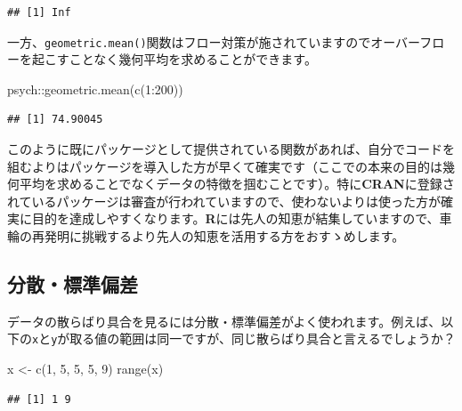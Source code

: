 \documentclass[
  12pt,
]{book}
\newenvironment{Shaded}{\begin{snugshade}}{\end{snugshade}}
\newcommand{\DecValTok}[1]{\textcolor[rgb]{0.00,0.00,0.81}{#1}}
\newcommand{\FunctionTok}[1]{\textcolor[rgb]{0.00,0.00,0.00}{#1}}
\newcommand{\NormalTok}[1]{#1}
\newcommand{\OtherTok}[1]{\textcolor[rgb]{0.56,0.35,0.01}{#1}}
\newcommand{\SpecialCharTok}[1]{\textcolor[rgb]{0.00,0.00,0.00}{#1}}
\begin{document}
\begin{verbatim}
## [1] Inf
\end{verbatim}

一方、\texttt{geometric.mean()}関数はフロー対策が施されていますのでオーバーフローを起こすことなく幾何平均を求めることができます。

\begin{Shaded}
\begin{Highlighting}[]
\NormalTok{psych}\SpecialCharTok{::}\FunctionTok{geometric.mean}\NormalTok{(}\FunctionTok{c}\NormalTok{(}\DecValTok{1}\SpecialCharTok{:}\DecValTok{200}\NormalTok{))}
\end{Highlighting}
\end{Shaded}

\begin{verbatim}
## [1] 74.90045
\end{verbatim}

このように既にパッケージとして提供されている関数があれば、自分でコードを組むよりはパッケージを導入した方が早くて確実です（ここでの本来の目的は幾何平均を求めることでなくデータの特徴を掴むことです）。特に\textbf{CRAN}に登録されているパッケージは審査が行われていますので、使わないよりは使った方が確実に目的を達成しやすくなります。\textbf{R}には先人の知恵が結集していますので、車輪の再発明に挑戦するより先人の知恵を活用する方をおすゝめします。

\hypertarget{ux5206ux6563ux6a19ux6e96ux504fux5dee}{%
\subsection{分散・標準偏差}\label{ux5206ux6563ux6a19ux6e96ux504fux5dee}}

データの散らばり具合を見るには分散・標準偏差がよく使われます。例えば、以下の\texttt{x}と\texttt{y}が取る値の範囲は同一ですが、同じ散らばり具合と言えるでしょうか？

\begin{Shaded}
\begin{Highlighting}[]
\NormalTok{x }\OtherTok{\textless{}{-}} \FunctionTok{c}\NormalTok{(}\DecValTok{1}\NormalTok{, }\DecValTok{5}\NormalTok{, }\DecValTok{5}\NormalTok{, }\DecValTok{5}\NormalTok{, }\DecValTok{9}\NormalTok{)}
\FunctionTok{range}\NormalTok{(x)}
\end{Highlighting}
\end{Shaded}

\begin{verbatim}
## [1] 1 9
\end{verbatim}
\end{document}
